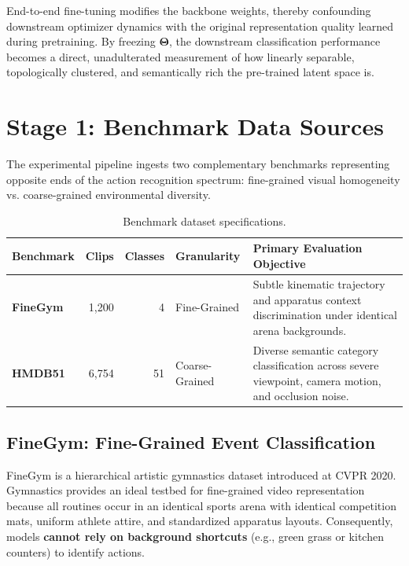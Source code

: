 \documentclass[a4paper, 11pt]{article}
\begin{document}
\begin{highlightbox}
End-to-end fine-tuning modifies the backbone weights, thereby confounding downstream optimizer dynamics with the original representation quality learned during pretraining. By freezing $\mathbf{\Theta}$, the downstream classification performance becomes a direct, unadulterated measurement of how linearly separable, topologically clustered, and semantically rich the pre-trained latent space is.
\end{highlightbox}

\section{Stage 1: Benchmark Data Sources}

The experimental pipeline ingests two complementary benchmarks representing opposite ends of the action recognition spectrum: fine-grained visual homogeneity vs. coarse-grained environmental diversity.

\begin{table}[h!]
\centering
\small
\renewcommand{\arraystretch}{1.2}
\begin{tabularx}{\textwidth}{l r r l X}
\toprule
\textbf{Benchmark} & \textbf{Clips} & \textbf{Classes} & \textbf{Granularity} & \textbf{Primary Evaluation Objective} \\
\midrule
\textbf{FineGym} & 1,200 & 4 & Fine-Grained & Subtle kinematic trajectory and apparatus context discrimination under identical arena backgrounds. \\
\textbf{HMDB51}  & 6,754 & 51 & Coarse-Grained & Diverse semantic category classification across severe viewpoint, camera motion, and occlusion noise. \\
\bottomrule
\end{tabularx}
\caption{Benchmark dataset specifications.}
\end{table}

\subsection{FineGym: Fine-Grained Event Classification}
FineGym is a hierarchical artistic gymnastics dataset introduced at CVPR 2020. Gymnastics provides an ideal testbed for fine-grained video representation because all routines occur in an identical sports arena with identical competition mats, uniform athlete attire, and standardized apparatus layouts. Consequently, models \textbf{cannot rely on background shortcuts} (e.g., green grass or kitchen counters) to identify actions.
\end{document}
